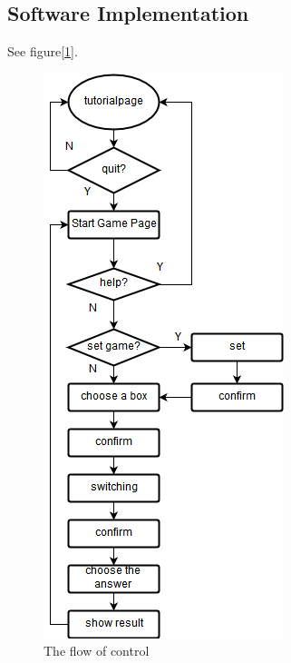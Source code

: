 \subsection{Software Implementation}
See figure[\ref{fig:flow}].
\begin{figure}[!htbp]
	\centering
	\includegraphics{images/flowchart.png}
	\caption{The flow of control}
	\label{fig:flow}
\end{figure}
